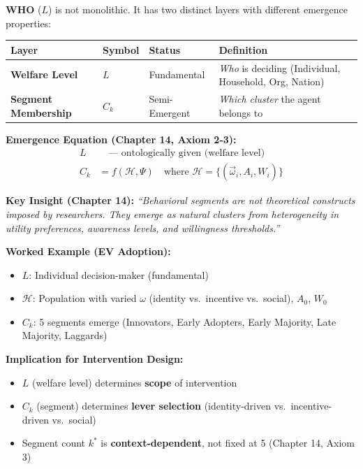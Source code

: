
\begin{tcolorbox}[colback=yellow!5!white, colframe=yellow!75!black,
    title=\textbf{Refinement: The Two Layers of Decision-Maker ($L$) --- Chapter 14}]

\textbf{WHO} ($L$) is not monolithic. It has two distinct layers with different emergence properties:

\begin{center}
\renewcommand{\arraystretch}{1.3}
\begin{tabular}{@{}llll@{}}
\toprule
\textbf{Layer} & \textbf{Symbol} & \textbf{Status} & \textbf{Definition} \\
\midrule
\textbf{Welfare Level} & $L$ & Fundamental & \textit{Who} is deciding (Individual, Household, Org, Nation) \\
\textbf{Segment Membership} & $C_k$ & Semi-Emergent & \textit{Which cluster} the agent belongs to \\
\bottomrule
\end{tabular}
\end{center}

\textbf{Emergence Equation (Chapter 14, Axiom 2-3):}
\begin{align}
L &\quad \text{--- ontologically given (welfare level)} \\
C_k &= f(\mathcal{H}, \Psi) \quad \text{where } \mathcal{H} = \{(\vec{\omega}_i, A_i, W_i)\}
\end{align}

\textbf{Key Insight (Chapter 14):} \textit{``Behavioral segments are not theoretical constructs imposed by researchers. They emerge as natural clusters from heterogeneity in utility preferences, awareness levels, and willingness thresholds.''}

\textbf{Worked Example (EV Adoption):}
\begin{itemize}[nosep]
    \item $L$: Individual decision-maker (fundamental)
    \item $\mathcal{H}$: Population with varied $\omega$ (identity vs.\ incentive vs.\ social), $A_0$, $W_0$
    \item $C_k$: 5 segments emerge (Innovators, Early Adopters, Early Majority, Late Majority, Laggards)
\end{itemize}

\textbf{Implication for Intervention Design:}
\begin{itemize}[nosep]
    \item $L$ (welfare level) determines \textbf{scope} of intervention
    \item $C_k$ (segment) determines \textbf{lever selection} (identity-driven vs.\ incentive-driven vs.\ social)
    \item Segment count $k^*$ is \textbf{context-dependent}, not fixed at 5 (Chapter 14, Axiom 3)
\end{itemize}

\end{tcolorbox}

